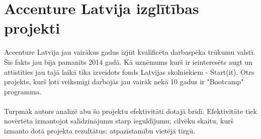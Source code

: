 \section{Accenture Latvija izglītības projekti}
Accenture Latvija jau vairākus gadus izjūt kvalificēta darbaspēka trūkumu valstī. Šis fakts jau bija pamanīts
2014 gadā. Kā uzņēmums kurš ir ieinteresēts augt un attīstīties jau tajā laikā tika izveidots fonds Latvijas
skolniekiem - Start(it). Otrs projekts, kurš ļoti veiksmīgi darbojās jau vairāk nekā 10 gadus ir "Bootcamp" programma.
\paragraph{}
Turpmāk autors analizē abu šo projektu efektivitāti dotajā brīdī. Efektivitāte tiek novērtēta izmantojot salīdzinājumu
starp ieguldījumu; cilvēku skaitu, kurš izmanto dotā projekta rezultātus; atpazīstamību vietējā tirgū.
  

